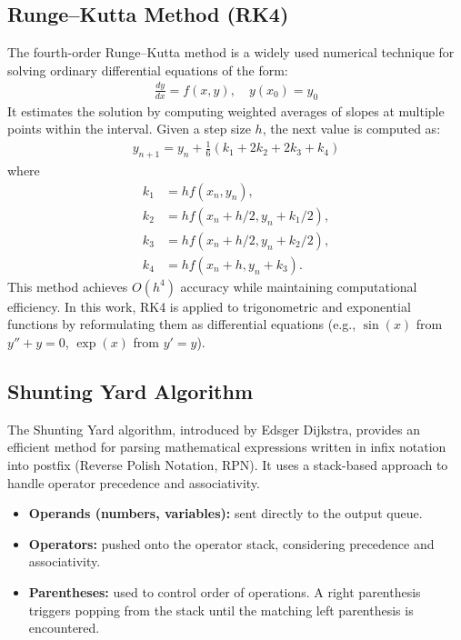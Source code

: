 \documentclass[conference]{IEEEtran}
\begin{document}
\subsection{Runge--Kutta Method (RK4)}
The fourth-order Runge--Kutta method is a widely used numerical technique for solving ordinary differential equations of the form:
\begin{align}
\frac{dy}{dx} = f(x,y), \quad y(x_0)=y_0
\end{align}
It estimates the solution by computing weighted averages of slopes at multiple points within the interval. Given a step size $h$, the next value is computed as:
\begin{align}
y_{n+1} = y_n + \frac{1}{6}(k_1 + 2k_2 + 2k_3 + k_4)
\end{align}
where
\begin{align}
k_1 &= h f(x_n,y_n), \\
k_2 &= h f(x_n + h/2, y_n + k_1/2), \\
k_3 &= h f(x_n + h/2, y_n + k_2/2), \\
k_4 &= h f(x_n + h, y_n + k_3).
\end{align}
This method achieves $O(h^4)$ accuracy while maintaining computational efficiency. In this work, RK4 is applied to trigonometric and exponential functions by reformulating them as differential equations (e.g., $\sin(x)$ from $y''+y=0$, $\exp(x)$ from $y'=y$).

\subsection{Shunting Yard Algorithm}
The Shunting Yard algorithm, introduced by Edsger Dijkstra, provides an efficient method for parsing mathematical expressions written in infix notation into postfix (Reverse Polish Notation, RPN). It uses a stack-based approach to handle operator precedence and associativity.  

\begin{itemize}
    \item \textbf{Operands (numbers, variables):} sent directly to the output queue.  
    \item \textbf{Operators:} pushed onto the operator stack, considering precedence and associativity.  
    \item \textbf{Parentheses:} used to control order of operations. A right parenthesis triggers popping from the stack until the matching left parenthesis is encountered.  
\end{itemize}
\end{document}
